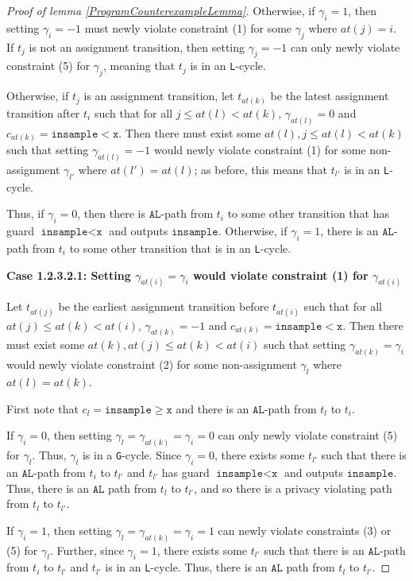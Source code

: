 \documentclass[12pt]{article}
\newcommand{\gguard}[1][x]{\texttt{insample}\geq #1}
\newcommand{\lguard}[1][x]{\texttt{insample} < #1}
\newcommand{\gcycle}{\texttt{G}-cycle}
\newcommand{\lcycle}{\texttt{L}-cycle}
\theoremstyle{definition}
\begin{document}
\begin{proof}[Proof of lemma \ref{ProgramCounterexampleLemma}]
    Otherwise, if $\gamma_i = 1$, then setting $\gamma_i = -1$ must newly violate constraint (1) for some $\gamma_j$ where $at(j) = i$. If $t_{j}$ is not an assignment transition, then setting $\gamma_{j} = -1$ can only newly violate constraint (5) for $\gamma_{j}$, meaning that $t_j$ is in an \lcycle. 

    Otherwise, if $t_j$ is an assignment transition, let $t_{at(k)}$ be the latest assignment transition after $t_{i}$ such that for all $j\leq at(l)< at(k)$, $\gamma_{at(l)} =0$ and $c_{at(k)} = \lguard[\texttt{x}]$. Then there must exist some $at(l), j\leq at(l)< at(k)$ such that setting $\gamma_{at(l)}=-1$ would newly violate constraint (1) for some non-assignment $\gamma_{l'}$ where $at(l') = at(l)$; as before, this means that $t_{l'}$ is in an \lcycle.  

    Thus, if $\gamma_i =0$, then there is $\texttt{AL}$-path from $t_i$ to some other transition that has guard $\lguard[\texttt{x}]$ and outputs $\texttt{insample}$. Otherwise, if $\gamma_i = 1$, there is an $\texttt{AL}$-path from $t_i$ to some other transition that is in an \lcycle. 

    \textbf{Case 1.2.3.2.1: Setting $\gamma_{at(i)} = \gamma_i$ would violate constraint (1) for $\gamma_{at(i)}$}

    Let $t_{at(j)}$ be the earliest assignment transition before $t_{at(i)}$ such that for all $at(j)\leq at(k)< at(i)$, $\gamma_{at(k)} =-1$ and $c_{at(k)} = \lguard[\texttt{x}]$. Then there must exist some $at(k), at(j)\leq at(k)< at(i)$ such that setting $\gamma_{at(k)}=\gamma_i$ would newly violate constraint (2) for some non-assignment $\gamma_l$ where $at(l) = at(k)$.

    First note that $c_l = \gguard[\texttt{x}]$ and there is an $\texttt{AL}$-path from $t_l$ to $t_i$. 
    
    If $\gamma_i = 0$, then setting $\gamma_l = \gamma_{at(k)} = \gamma_i = 0$ can only newly violate constraint (5) for $\gamma_l$. Thus, $\gamma_l$ is in a \gcycle. Since $\gamma_i = 0$, there exists some $t_{l'}$ such that there is an $\texttt{AL}$-path from $t_i$ to $t_{l'}$ and $t_{l'}$ has guard $\lguard[\texttt{x}]$ and outputs $\texttt{insample}$. Thus, there is an $\texttt{AL}$ path from $t_l$ to $t_{l'}$, and so there is a privacy violating path from $t_l$ to $t_{l'}$. 
    
    If $\gamma_i = 1$, then setting $\gamma_l = \gamma_{at(k)} = \gamma_i = 1$ can newly violate constraints (3) or (5) for $\gamma_l$. Further, since $\gamma_i =1$, there exists some $t_{l'}$ such that there is an $\texttt{AL}$-path from $t_i$ to $t_{l'}$ and $t_{l'}$ is in an \lcycle. Thus, there is an $\texttt{AL}$ path from $t_l$ to $t_{l'}$.
    

\end{proof}
\end{document}
